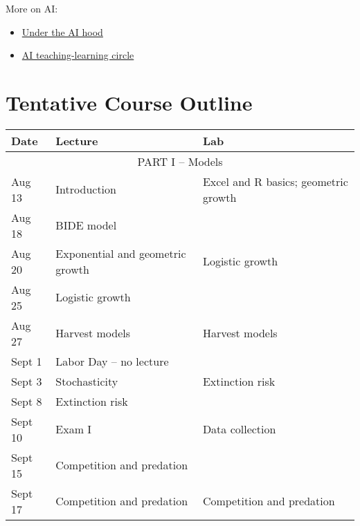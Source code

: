 \documentclass[12pt]{article}
\begin{document}
More on AI:

\begin{itemize}
  \item \href{https://thebullshitmachines.com/}{Under the AI hood}
  \item \href{https://drive.google.com/file/d/1AN9GrksC4kLIE57fuS4zg8nPsyYtNEmr/view?usp=sharing}{AI
    teaching-learning circle}
\end{itemize}
\clearpage

\section*{\normalsize Tentative Course Outline}

\begin{center}
\begin{tabular}[c]{lll}
\hline \hline
{\bf Date} & {\bf Lecture}                      & {\bf Lab}                      \\
\hline
           \multicolumn{3}{c}{PART I -- Models}                                        \\
\hline
\hline
Aug 13     & Introduction                       & Excel and R basics; geometric growth \\
\hline
Aug 18     & BIDE model                         &                                      \\
Aug 20     & Exponential and geometric growth   & Logistic growth                      \\
\hline
Aug 25     & Logistic growth                    &                                      \\
Aug 27     & Harvest models                     & Harvest models                       \\
\hline
Sept 1     & Labor Day -- no lecture            &                                      \\
Sept 3     & Stochasticity                      & Extinction risk                      \\
\hline
Sept 8    & Extinction risk                    &                                      \\
Sept 10    & Exam I                             & Data collection                      \\
\hline
Sept 15    & Competition and predation          &                                      \\
Sept 17    & Competition and predation          & Competition and predation            \\

\end{tabular}
\end{center}
\end{document}
